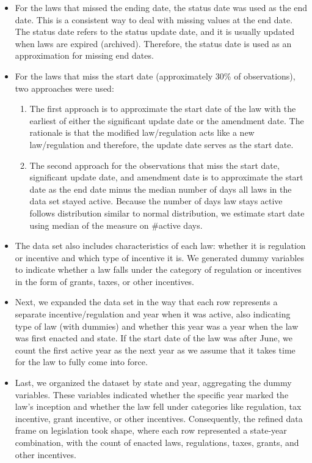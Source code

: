 \documentclass[
]{article}
\providecommand{\tightlist}{%
  \setlength{\itemsep}{0pt}\setlength{\parskip}{0pt}}
\begin{document}
\begin{itemize}
\item
  For the laws that missed the ending date, the status date was used as
  the end date. This is a consistent way to deal with missing values at
  the end date. The status date refers to the status update date, and it
  is usually updated when laws are expired (archived). Therefore, the
  status date is used as an approximation for missing end dates.
\item
  For the laws that miss the start date (approximately 30\% of
  observations), two approaches were used:

  \begin{enumerate}
  \def\labelenumi{\arabic{enumi}.}
  \tightlist
  \item
    The first approach is to approximate the start date of the law with
    the earliest of either the significant update date or the amendment
    date. The rationale is that the modified law/regulation acts like a
    new law/regulation and therefore, the update date serves as the
    start date.
  \item
    The second approach for the observations that miss the start date,
    significant update date, and amendment date is to approximate the
    start date as the end date minus the median number of days all laws
    in the data set stayed active. Because the number of days law stays
    active follows distribution similar to normal distribution, we
    estimate start date using median of the measure on \#active days.
  \end{enumerate}
\item
  The data set also includes characteristics of each law: whether it is
  regulation or incentive and which type of incentive it is. We
  generated dummy variables to indicate whether a law falls under the
  category of regulation or incentives in the form of grants, taxes, or
  other incentives.
\item
  Next, we expanded the data set in the way that each row represents a
  separate incentive/regulation and year when it was active, also
  indicating type of law (with dummies) and whether this year was a year
  when the law was first enacted and state. If the start date of the law
  was after June, we count the first active year as the next year as we
  assume that it takes time for the law to fully come into force.
\item
  Last, we organized the dataset by state and year, aggregating the
  dummy variables. These variables indicated whether the specific year
  marked the law's inception and whether the law fell under categories
  like regulation, tax incentive, grant incentive, or other incentives.
  Consequently, the refined data frame on legislation took shape, where
  each row represented a state-year combination, with the count of
  enacted laws, regulations, taxes, grants, and other incentives.
\end{itemize}
\end{document}
